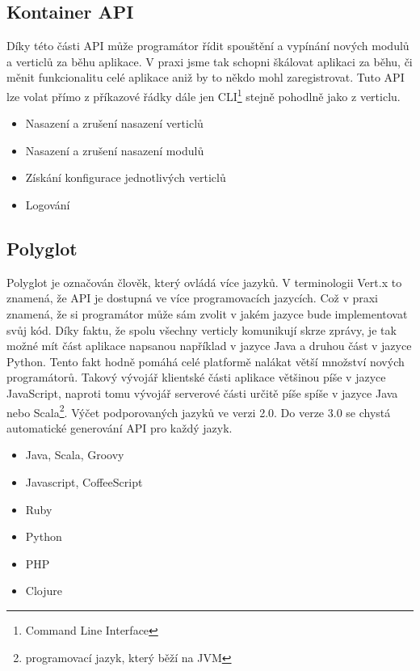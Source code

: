 \subsection{Kontainer API}

Díky této části API může programátor řídit spouštění a vypínání nových modulů a verticlů za běhu aplikace. V praxi jsme tak schopni škálovat aplikaci za běhu, či měnit funkcionalitu celé aplikace aniž by to někdo mohl zaregistrovat. Tuto API lze volat přímo z příkazové řádky dále jen CLI\footnote{Command Line Interface} stejně pohodlně jako z verticlu.

\begin{itemize}
\item{Nasazení a zrušení nasazení verticlů}
\item{Nasazení a zrušení nasazení modulů}
\item{Získání konfigurace jednotlivých verticlů}
\item{Logování}
\end{itemize}

\subsection{Polyglot}

Polyglot je označován člověk, který ovládá více jazyků. V terminologii Vert.x to znamená, že API je dostupná ve více programovacích jazycích. Což v praxi znamená, že si programátor může sám zvolit v jakém jazyce bude implementovat svůj kód. Díky faktu, že spolu všechny verticly komunikují skrze zprávy, je tak možné mít část aplikace napsanou například v jazyce Java a druhou část v jazyce Python. Tento fakt hodně pomáhá celé platformě nalákat větší množství nových programátorů. Takový vývojář klientské části aplikace většinou píše v jazyce JavaScript, naproti tomu vývojář serverové části určitě píše spíše v jazyce Java nebo Scala\footnote{programovací jazyk, který běží na JVM}. Výčet podporovaných jazyků ve verzi 2.0. Do verze 3.0 se chystá automatické generování API pro každý jazyk.

\begin{itemize}
\item{Java, Scala, Groovy}
\item{Javascript, CoffeeScript}
\item{Ruby}
\item{Python}
\item{PHP}
\item{Clojure}
\end{itemize}

